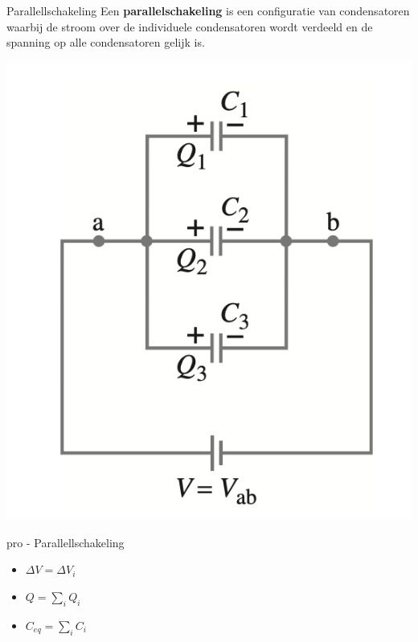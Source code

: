 \newpage

\begin{theo}[Parallellschakeling]{Parallellschakeling}
    Een \textbf{parallelschakeling} is een configuratie van condensatoren waarbij de stroom over de individuele condensatoren wordt verdeeld en de spanning op alle condensatoren gelijk is. 
    \begin{center}
        \includegraphics[scale = 0.35]{Images/Elektriciteit/Parallelleschakeling.png}
    \end{center}
\end{theo}

\begin{pro}{pro - Parallellschakeling}
    \begin{itemize}
        \item $\Delta V = \Delta V_i$
        \item $Q = \sum_i Q_i$
        \item $C_{eq} = \sum_i C_i $
    \end{itemize}
\end{pro}

